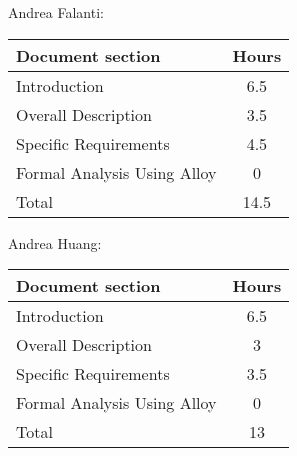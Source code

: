 Andrea Falanti:

\begin{tabular}{|l|c|}
    \hline
    Document section & Hours \\
    \hline
     Introduction & 6.5\\
     Overall Description & 3.5\\
     Specific Requirements & 4.5\\
     Formal Analysis Using Alloy & 0\\
     \hline
     Total & 14.5\\
     \hline
\end{tabular}
\vskip 0.3in

Andrea Huang:

\begin{tabular}{|l|c|}
    \hline
    Document section & Hours \\
    \hline
     Introduction &  6.5\\
     Overall Description & 3\\
     Specific Requirements & 3.5\\
     Formal Analysis Using Alloy & 0\\
     \hline
     Total & 13\\
     \hline
\end{tabular}
